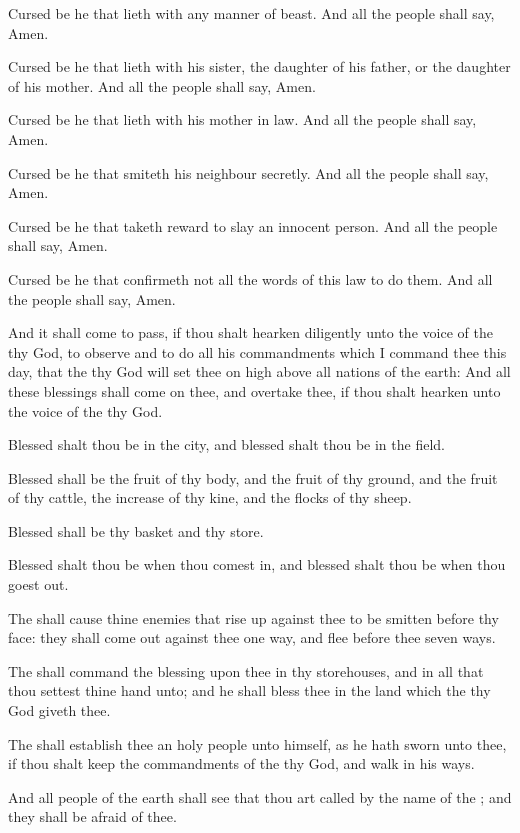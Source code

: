 \Verse Cursed be he that lieth with any manner of beast. And all the people shall say, Amen.

\Verse Cursed be he that lieth with his sister, the daughter of his father, or the daughter of his mother. And all the people shall say, Amen.

\Verse Cursed be he that lieth with his mother in law. And all the people shall say, Amen.

\Verse Cursed be he that smiteth his neighbour secretly. And all the people shall say, Amen.

\Verse Cursed be he that taketh reward to slay an innocent person. And all the people shall say, Amen.

\Verse Cursed be he that confirmeth not all the words of this law to do them. And all the people shall say, Amen.


\Chapter
\Verse And it shall come to pass, if thou shalt hearken diligently unto the voice of the \LORD thy God, to observe and to do all his commandments which I command thee this day, that the \LORD thy God will set thee on high above all nations of the earth: \Verse And all these blessings shall come on thee, and overtake thee, if thou shalt hearken unto the voice of the \LORD thy God.

\Verse Blessed shalt thou be in the city, and blessed shalt thou be in the field.

\Verse Blessed shall be the fruit of thy body, and the fruit of thy ground, and the fruit of thy cattle, the increase of thy kine, and the flocks of thy sheep.

\Verse Blessed shall be thy basket and thy store.

\Verse Blessed shalt thou be when thou comest in, and blessed shalt thou be when thou goest out.

\Verse The \LORD shall cause thine enemies that rise up against thee to be smitten before thy face: they shall come out against thee one way, and flee before thee seven ways.

\Verse The \LORD shall command the blessing upon thee in thy storehouses, and in all that thou settest thine hand unto; and he shall bless thee in the land which the \LORD thy God giveth thee.

\Verse The \LORD shall establish thee an holy people unto himself, as he hath sworn unto thee, if thou shalt keep the commandments of the \LORD thy God, and walk in his ways.

\Verse And all people of the earth shall see that thou art called by the name of the \LORD; and they shall be afraid of thee.

